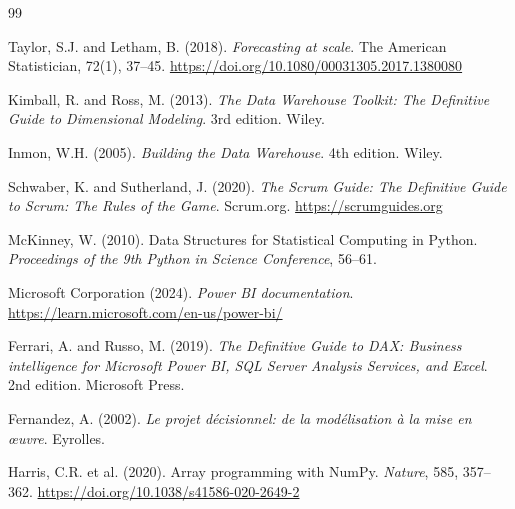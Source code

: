 \documentclass[12pt, a4paper]{report}
\begin{document}
\begin{thebibliography}{99}

Taylor, S.J. and Letham, B. (2018).
\textit{Forecasting at scale}.
The American Statistician, 72(1), 37--45.
\url{https://doi.org/10.1080/00031305.2017.1380080}

Kimball, R. and Ross, M. (2013).
\textit{The Data Warehouse Toolkit: The Definitive Guide to Dimensional Modeling}.
3rd edition. Wiley.

Inmon, W.H. (2005).
\textit{Building the Data Warehouse}.
4th edition. Wiley.

Schwaber, K. and Sutherland, J. (2020).
\textit{The Scrum Guide: The Definitive Guide to Scrum: The Rules of the Game}.
Scrum.org. \url{https://scrumguides.org}

McKinney, W. (2010).
Data Structures for Statistical Computing in Python.
\textit{Proceedings of the 9th Python in Science Conference}, 56--61.

Microsoft Corporation (2024).
\textit{Power BI documentation}.
\url{https://learn.microsoft.com/en-us/power-bi/}

Ferrari, A. and Russo, M. (2019).
\textit{The Definitive Guide to DAX: Business intelligence for Microsoft Power BI,
SQL Server Analysis Services, and Excel}.
2nd edition. Microsoft Press.

Fernandez, A. (2002).
\textit{Le projet décisionnel: de la modélisation à la mise en œuvre}.
Eyrolles.

Harris, C.R. et al. (2020).
Array programming with NumPy.
\textit{Nature}, 585, 357--362.
\url{https://doi.org/10.1038/s41586-020-2649-2}

\end{thebibliography}
\end{document}
